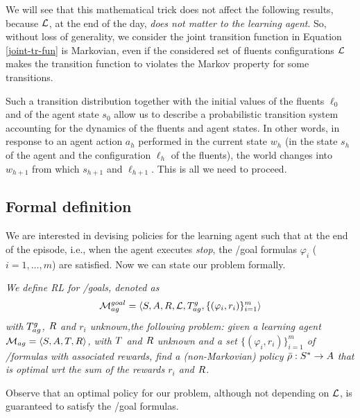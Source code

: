 We will see that this mathematical trick does not affect the following results, because $\mathcal{L}$, at the end of the day, \emph{does not matter to the learning agent}.
So, without loss of generality, we consider the joint transition function in Equation \ref{joint-tr-fun} is Markovian, even if the considered set of fluents configurations $\mathcal{L}$ makes the transition function to violates the Markov property for some transitions.

Such a transition distribution together with the initial values of the
fluents $\ell_0$ and of the agent state $s_0$ allow us to describe a
probabilistic transition system accounting for the dynamics of the
fluents and agent states. 
In other words, in response to an agent action $a_h$ performed in the current state
$w_h$ (in the state $s_h$ of the agent and the
configuration $\ell_h$ of the fluents), the world changes into $w_{h+1}$ from which $s_{h+1} $ and $\ell_{h+1}$. This is all we need to proceed.

\medskip

\subsection{Formal definition}
We are interested in devising policies for the learning agent such that
at the end of the episode, i.e., when the agent executes \emph{stop},
the \LTLf /\LDLf goal formulas $\varphi_i$ ($i=1,\ldots,m$)  are satisfied.
Now we can state our problem formally.

\noindent
\begin{definition}\label{def:rl-for-llf-goals}
	 \textit{
	We define \emph{RL for \LTLf /\LDLf goals}, denoted as
	\[\mathcal{M}_{ag}^{goal}= \langle S, A, R, \mathcal{L}, T_{ag}^{g}, \{(\varphi_i,r_i)\}_{i=1}^{m} \rangle\] with $T_{ag}^{g}$, $R$ and
	$r_i$ unknown,the following problem: given a learning agent
	$\mathcal{M}_{ag} = \langle S, A, T, R \rangle$, with $T$ and $R$ unknown and
	a set $\{(\varphi_i,r_i)\}_{i=1}^{m}$ of \LTLf /\LDLf formulas with
	associated rewards, find a (non-Markovian) policy
	$\bar{\rho}:S^*\rightarrow A$ that is optimal wrt the sum of the rewards
	$r_i$ and $R$.}
\end{definition}
Observe that an optimal policy for our problem, although not depending on $\mathcal{L}$, is guaranteed to satisfy the \LTLf /\LDLf goal formulas.


